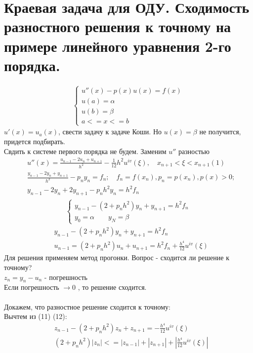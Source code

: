 \documentclass[12pt,a4paper]{article}
\begin{document}
	\section{Краевая задача для ОДУ. Сходимость разностного решения к точному на примере линейного уравнения  2-го порядка.}
	\begin{align}
	\begin{cases}
	u''(x) - p(x)u(x) = f(x)\\
	u(a) = \alpha\\
	u(b) = \beta\\
	a <= x <= b
	\end{cases}	
	\end{align}
	$u'(x) = u_a(x)$, свести задачу к задаче Коши. Но $u(x) = \beta$ не получится, придется подбирать.\\
	Свдить к системе первого порядка не будем. Заменим $u''$ разностью\\
	\begin{align*}
	&u''(x) = \frac{u_{n-1}-2u_n+u_{n+1}}{h^2} -\frac{1}{12}h^2 u^{iv}(\xi), \quad x_{n+1} < \xi < x_{n+1} (1)\\
	&\frac{y_{n-1} - 2y_n + y_{n+1}}{h^2} - p_n y_n = f_n; \quad f_n = f(x_n), p_n = p(x_n), p(x) > 0;\\
	&y_{n-1} - 2y_n + 2y_{n+1} -p_nh^2 y_n = h^2 f_n
	\end{align*}
	\begin{align*}
	\begin{cases}
	y_{n-1} - (2+p_n h^2)y_n + y_{n+1} = h^2f_n\\
	y_0 = \alpha \qquad y_N = \beta
	\end{cases}	
	\end{align*}	
	\begin{align}
	&y_{n-1} - (2+p_n h^2)y_n + y_{n+1} = h^2f_n\\
	&u_{n-1} = (2 + p_n h^2) u_n + u_{n+1} = h^2 f_n + \frac{h^4}{12}u^{iv}(\xi)
	\end{align}
	Для решения применяем метод прогонки. Вопрос - сходится ли решение к точному? \\
	$z_n = y_n - u_n$ - погрешность\\
	Если погрешность $\rightarrow 0$ , то решение сходится.\\\\
	Докажем, что разностное решение сходится к точному: \\
	Вычтем из (11) (12):
	\begin{align*}
	&z_{n-1} - (2 + p_n h^2) z_n + z_{n+1} = -\frac{h^4}{12}u^{iv}(\xi)\\
	&(2 + p_n h^2)|z_n| <= |z_{n-1}| + |z_{n+1}| + |\frac{h^4}{12}u^{iv}(\xi)|
	\end{align*}
\end{document}
